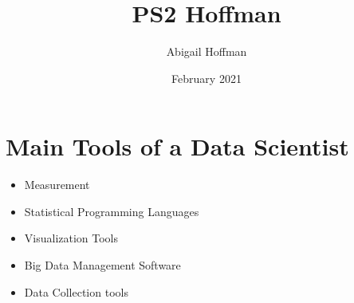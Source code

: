\documentclass{article}
\title{PS2 Hoffman}
\author{Abigail Hoffman}
\date{February 2021}
\begin{document}
\maketitle 

\section{Main Tools of a Data Scientist}

\begin{itemize}
    \item Measurement
    \item Statistical Programming Languages 
    \item Visualization Tools
    \item Big Data Management Software
    \item Data Collection tools
\end{itemize}
\end{document}
